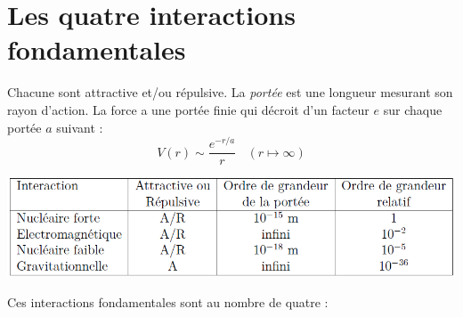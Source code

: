 \documentclass	[11pt, a4paper, openany]{book}
\begin{document}
	\section{Les quatre interactions fondamentales}
	Chacune sont attractive et/ou répulsive. La \textit{portée} est une longueur mesurant son rayon d'action. La force a une portée finie qui décroit d'un facteur $e$ sur chaque portée $a$ suivant :
	\begin{equation}
		V(r) \sim \frac{e^{-r/a}}{r}\ \ \ \ (r \mapsto \infty)
	\end{equation}
	\begin{center}
		\includegraphics[scale=0.5]{img/interf}
	\end{center}
	Ces interactions fondamentales sont au nombre de quatre :
\end{document}
